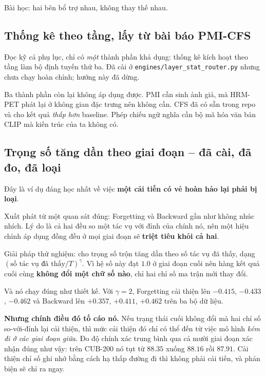 \documentclass[11pt,a4paper]{article}
\newenvironment{luuy}{\begin{leftbar}\noindent\ignorespaces}{\end{leftbar}}
\begin{document}
Bài học: hai bên bổ trợ nhau, không thay thế nhau.

\subsection{Thống kê theo tầng, lấy từ bài báo PMI-CFS}

Đọc kỹ cả phụ lục, chỉ có \emph{một} thành phần khả dụng: thống kê kích hoạt theo
tầng làm bộ định tuyến thứ ba. Đã cài ở
\texttt{engines/layer\_stat\_router.py} nhưng chưa chạy hoàn chỉnh; hướng này đã
dừng.

Ba thành phần còn lại không áp dụng được. PMI cần sinh ảnh giả, mà HRM-PET phát
lại ở không gian đặc trưng nên không cần. CFS đã có sẵn trong repo và cho kết quả
\emph{thấp hơn} baseline. Phép chiếu ngữ nghĩa cần bộ mã hóa văn bản CLIP mà kiến
trúc của ta không có.

\subsection{Trọng số tăng dần theo giai đoạn -- đã cài, đã đo, đã loại}
\label{sec:ramp}

Đây là ví dụ đáng học nhất về việc \textbf{một cải tiến có vẻ hoàn hảo lại phải
bị loại}.

Xuất phát từ một quan sát đúng: Forgetting và Backward gần như không nhúc nhích.
Lý do là cả hai đều so một tác vụ với đỉnh của chính nó, nên một hiệu chỉnh áp
dụng đồng đều ở mọi giai đoạn sẽ \textbf{triệt tiêu khỏi cả hai}.

Giải pháp thử nghiệm: cho trọng số trộn tăng dần theo số tác vụ đã thấy, dạng
$(\text{số tác vụ đã thấy}/T)^{\gamma}$. Vì hệ số này đạt $1.0$ ở giai đoạn cuối
nên hàng kết quả cuối cùng \textbf{không đổi một chữ số nào}, chỉ hai chỉ số ma
trận mới thay đổi.

Và nó chạy đúng như thiết kế. Với $\gamma = 2$, Forgetting cải thiện lên $-0.415$,
$-0.433$, $-0.462$ và Backward lên $+0.357$, $+0.411$, $+0.462$ trên ba bộ dữ
liệu.

\begin{luuy}
\textbf{Nhưng chính điều đó tố cáo nó.} Nếu trạng thái cuối không đổi mà hai chỉ
số so-với-đỉnh lại cải thiện, thì mức cải thiện đó chỉ có thể đến từ việc mô hình
\emph{kém đi ở các giai đoạn giữa}. Đo độ chính xác trung bình qua cả mười giai
đoạn xác nhận đúng như vậy: trên CUB-200 nó tụt từ $88.35$ xuống $88.16$ rồi
$87.91$. Cải thiện chỉ số ghi nhớ bằng cách hạ thấp đường đi thì không phải cải
tiến, và phản biện sẽ chỉ ra ngay.
\end{luuy}
\end{document}
